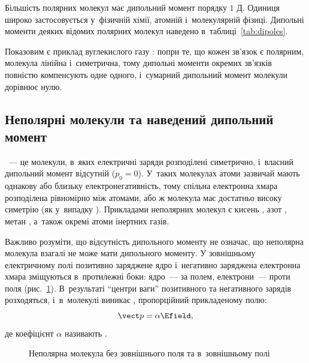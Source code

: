Більшість полярних молекул має дипольний момент порядку $1$ Д. Одиниця широко
застосовується у~фізичній хімії, атомній і~молекулярній фізиці. Дипольні моменти деяких
відомих полярних молекул наведено в~таблиці~\ref{tab:dipoles}.

Показовим є приклад вуглекислого газу : попри те, що кожен зв'язок  є
полярним, молекула лінійна і~симетрична, тому дипольні моменти окремих зв'язків повністю
компенсують одне одного, і~сумарний дипольний момент молекули дорівнює нулю.


\subsection*{Неполярні молекули та наведений дипольний момент}


~--- це молекули, в~яких електричні заряди розподілені
симетрично, і~власний дипольний момент відсутній ($p_0 = 0$). У~таких молекулах атоми
зазвичай мають однакову або близьку електронегативність, тому спільна електронна хмара
розподілена рівномірно між атомами, або ж молекула має достатньо високу симетрію (як
у~випадку ). Прикладами неполярних молекул є кисень , азот ,
метан , а~також окремі атоми інертних газів.

Важливо розуміти, що відсутність  дипольного моменту не означає, що
неполярна молекула взагалі не може мати дипольного моменту. У зовнішньому електричному
полі позитивно заряджене ядро і~негативно заряджена електронна хмара зміщуються
в~протилежні боки: ядро~--- за полем, електрони~--- проти поля
(рис.~\ref{pic:InducedDipole}). В~результаті \enquote{центри ваги} позитивного та
негативного зарядів розходяться, і~в~молекулі виникає , пропорційний прикладеному полю:
\begin{equation}\label{eq:InducedDipole}
	\vect p = \alpha \Efield,
\end{equation}
де коефіцієнт $\alpha$ називають .

\begin{figure}[h!]\centering
	\caption{Неполярна молекула без зовнішнього поля та в~зовнішньому
		полі\label{pic:InducedDipole}}
\end{figure}

